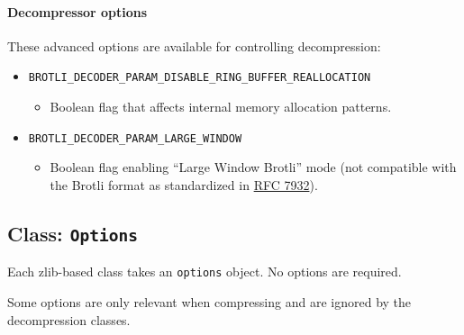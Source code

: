 \paragraph{Decompressor options}\label{decompressor-options}

These advanced options are available for controlling decompression:

\begin{itemize}
\tightlist
\item
  \texttt{BROTLI\_DECODER\_PARAM\_DISABLE\_RING\_BUFFER\_REALLOCATION}

  \begin{itemize}
  \tightlist
  \item
    Boolean flag that affects internal memory allocation patterns.
  \end{itemize}
\item
  \texttt{BROTLI\_DECODER\_PARAM\_LARGE\_WINDOW}

  \begin{itemize}
  \tightlist
  \item
    Boolean flag enabling ``Large Window Brotli'' mode (not compatible
    with the Brotli format as standardized in
    \href{https://www.rfc-editor.org/rfc/rfc7932.txt}{RFC 7932}).
  \end{itemize}
\end{itemize}

\subsection{\texorpdfstring{Class:
\texttt{Options}}{Class: Options}}\label{class-options}

Each zlib-based class takes an \texttt{options} object. No options are
required.

Some options are only relevant when compressing and are ignored by the
decompression classes.

